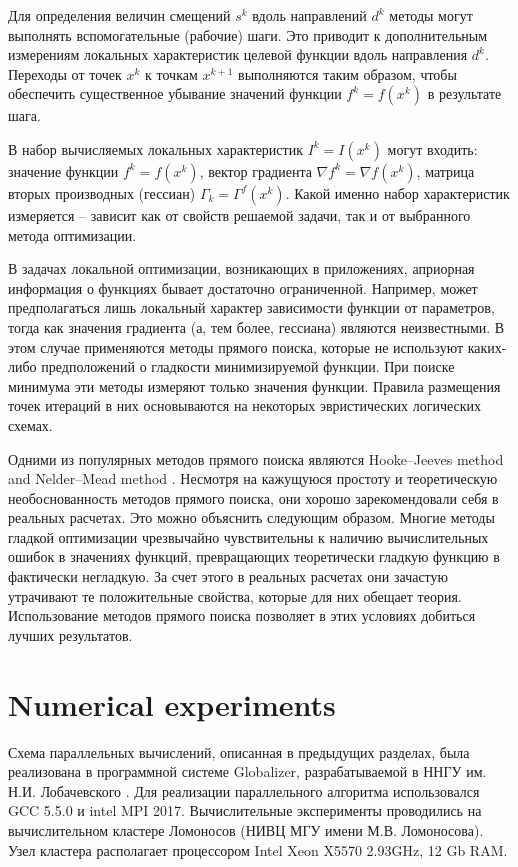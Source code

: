 \documentclass{svproc}
\begin{document}
Для определения величин смещений $s^k$ вдоль направлений $d^k$ методы могут выполнять вспомогательные (рабочие) шаги. Это приводит к дополнительным измерениям локальных характеристик целевой функции вдоль направления $d^k$. Переходы от точек $x^k$ к точкам $x^{k+1}$ выполняются таким образом, чтобы обеспечить существенное убывание значений функции $f^k = f( x^k )$ в результате шага.

В набор вычисляемых локальных характеристик $I^k=I(x^k)$ могут входить: значение функции $f^k = f( x^k )$, вектор градиента $\nabla f^k = \nabla f(x^k)$, матрица вторых производных (гессиан) $\Gamma_k=\Gamma^f(x^k)$. Какой именно набор характеристик измеряется -- зависит как от свойств решаемой задачи, так и от выбранного метода оптимизации.

В задачах локальной оптимизации, возникающих в приложениях, априорная информация о функциях бывает достаточно ограниченной. Например, может предполагаться лишь локальный характер зависимости функции от параметров, тогда как значения градиента (а, тем более, гессиана) являются неизвестными. В этом случае применяются методы прямого поиска, которые не используют каких-либо предположений о гладкости минимизируемой функции. При поиске минимума эти методы измеряют только значения функции. Правила размещения точек итераций в них основываются на некоторых эвристических логических схемах. 

Одними из популярных методов прямого поиска являются Hooke--Jeeves method \cite{HookJeeves} and Nelder--Mead method \cite{NelderMead}. Несмотря на кажущуюся простоту и теоретическую необоснованность методов прямого поиска, они хорошо зарекомендовали себя в реальных расчетах. Это можно объяснить следующим образом. Многие методы гладкой оптимизации чрезвычайно чувствительны к наличию вычислительных ошибок в значениях функций, превращающих теоретически гладкую функцию в фактически негладкую. За счет этого в реальных расчетах они зачастую утрачивают те положительные свойства, которые для них обещает теория. Использование методов прямого поиска позволяет в этих условиях добиться лучших результатов.

\section{Numerical experiments}

Схема параллельных вычислений, описанная в предыдущих разделах, была реализована в программной системе Globalizer, разрабатываемой в ННГУ им. Н.И. Лобачевского \cite{globalizerSystem,Sysoyev2017}.  
Для реализации параллельного алгоритма использовался GCC 5.5.0 и intel MPI 2017. Вычислительные эксперименты проводились на вычислительном кластере Ломоносов (НИВЦ МГУ имени М.В. Ломоносова). Узел кластера располагает процессором  Intel Xeon X5570 2.93GHz, 12 Gb RAM.
\end{document}
